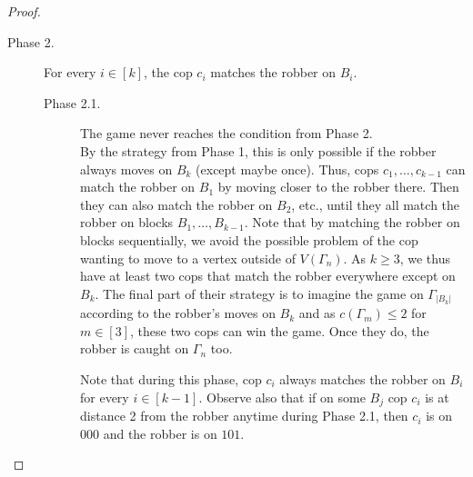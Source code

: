 \documentclass[10pt,a4paper]{amsart}
\begin{document}
\begin{proof}
\begin{description}
        \item[Phase 2.] For every $i \in [k]$, the cop $c_i$ matches the robber on $B_i$.
        \begin{description}
            \item[Phase 2.1.] The game never reaches the condition from Phase 2.\\
            By the strategy from Phase 1, this is only possible if the robber always moves on $B_k$ (except maybe once). Thus, cops $c_1, \ldots, c_{k-1}$ can match the robber on $B_1$ by moving closer to the robber there. Then they can also match the robber on $B_2$, etc., until they all match the robber on blocks $B_1, \ldots, B_{k-1}$. Note that by matching the robber on blocks sequentially, we avoid the possible problem of the cop wanting to move to a vertex outside of $V(\Gamma_n)$. As $k \geq 3$, we thus have at least two cops that match the robber everywhere except on $B_k$. The final part of their strategy is to imagine the game on $\Gamma_{|B_k|}$ according to the robber's moves on $B_k$ and as $c(\Gamma_m) \leq 2$ for $m \in [3]$, these two cops can win the game. Once they do, the robber is caught on $\Gamma_n$ too.

            Note that during this phase, cop $c_i$ always matches the robber on $B_i$ for every $i \in [k-1]$. Observe also that if on some $B_j$ cop $c_i$ is at distance 2 from the robber anytime during Phase 2.1, then $c_i$ is on $000$ and the robber is on $101$. 


\end{description}
\end{description}
\end{proof}
\end{document}
